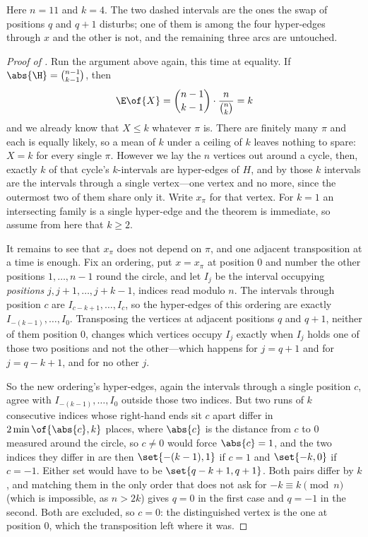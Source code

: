 Here $n = 11$ and $k = 4$. The two dashed intervals are the ones the swap of positions $q$ and $q + 1$ disturbs; one of them is among the four hyper-edges through $x$ and the other is not, and the remaining three arcs are untouched.

\begin{proof}[Proof of ]
    Run the argument above again, this time at equality. If $\abs{\H} = \binom{n-1}{k-1}$, then
    \begin{align*}
        \E\of{X} = \binom{n-1}{k-1} \cdot \frac{n}{\binom{n}{k}} = k
    \end{align*}
    and we already know that $X \leq k$ whatever $\pi$ is. There are finitely many $\pi$ and each is equally likely, so a mean of $k$ under a ceiling of $k$ leaves nothing to spare: $X = k$ for every single $\pi$. However we lay the $n$ vertices out around a cycle, then, exactly $k$ of that cycle's $k$-intervals are hyper-edges of $H$, and by  those $k$ intervals are the intervals through a single vertex---one vertex and no more, since the outermost two of them share only it. Write $x_{\pi}$ for that vertex. For $k = 1$ an intersecting family is a single hyper-edge and the theorem is immediate, so assume from here that $k \geq 2$.

    It remains to see that $x_{\pi}$ does not depend on $\pi$, and one adjacent transposition at a time is enough. Fix an ordering, put $x = x_{\pi}$ at position $0$ and number the other positions $1, \ldots, n - 1$ round the circle, and let $I_j$ be the interval occupying \emph{positions} $j, j + 1, \ldots, j + k - 1$, indices read modulo $n$. The intervals through position $c$ are $I_{c-k+1}, \ldots, I_{c}$, so the hyper-edges of this ordering are exactly $I_{-(k-1)}, \ldots, I_{0}$. Transposing the vertices at adjacent positions $q$ and $q + 1$, neither of them position $0$, changes which vertices occupy $I_j$ exactly when $I_j$ holds one of those two positions and not the other---which happens for $j = q + 1$ and for $j = q - k + 1$, and for no other $j$.

    So the new ordering's hyper-edges, again the intervals through a single position $c$, agree with $I_{-(k-1)}, \ldots, I_{0}$ outside those two indices. But two runs of $k$ consecutive indices whose right-hand ends sit $c$ apart differ in $2\min\of{\abs{c}, k}$ places, where $\abs{c}$ is the distance from $c$ to $0$ measured around the circle, so $c \neq 0$ would force $\abs{c} = 1$, and the two indices they differ in are then $\set{-(k-1), 1}$ if $c = 1$ and $\set{-k, 0}$ if $c = -1$. Either set would have to be $\set{q - k + 1, q + 1}$. Both pairs differ by $k$, and matching them in the only order that does not ask for $-k \equiv k \pmod{n}$ (which is impossible, as $n > 2k$) gives $q = 0$ in the first case and $q = -1$ in the second. Both are excluded, so $c = 0$: the distinguished vertex is the one at position $0$, which the transposition left where it was.


\end{proof}
